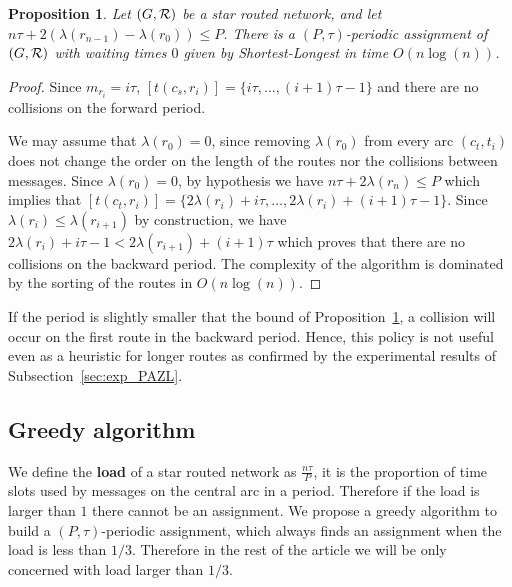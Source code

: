 \documentclass[10pt, conference, letterpaper]{IEEEtran}
\newtheorem{proposition}{Proposition}
\begin{document}
      
      \begin{proposition} Let $(G, {\cal R})$ be a star routed network, and let $n\tau + 2(\lambda(r_{n-1}) - \lambda(r_{0})) \leq P$. There is a $(P,\tau)$-periodic assignment of $(G, {\cal R})$ with waiting times $0$ given by Shortest-Longest in time $O(n\log(n))$.\label{prop:SL}
      \end{proposition}
      \begin{proof}
       Since $m_{r_i} = i\tau$, $[t(c_s,r_{i})] = \{i\tau,\dots, (i+1)\tau -1\}$ and there are no collisions on the forward period.
       
       
       We may assume that $\lambda(r_{0}) = 0$, since removing $\lambda(r_{0})$ from every arc $(c_t,t_i)$ does not change the order on the length of the routes nor the collisions between messages.
       Since $\lambda(r_{0}) = 0$, by hypothesis we have $n\tau + 2\lambda(r_{n}) \leq P$ which implies that
       $[t(c_t,r_{i})] = \{2 \lambda(r_{i}) + i\tau, \dots,  2 \lambda(r_{i}) + (i+1)\tau -1\}$.
       Since $ \lambda(r_{i}) \leq  \lambda(r_{i+1})$ by construction, we have  $2 \lambda(r_{i}) + i\tau -1 < 2 \lambda(r_{i+1}) + (i+1)\tau$ which proves that there are no collisions on the backward period. 
 The complexity of the algorithm is dominated by the sorting of the routes in $O(n\log(n))$. 
      \end{proof}

      If the period is slightly smaller that the bound of Proposition~\ref{prop:SL}, a collision will occur on the first route in the backward period. Hence, this policy is not useful even as a heuristic for longer routes as confirmed by the experimental results of Subsection~\ref{sec:exp_PAZL}. 

   
    \subsection{Greedy algorithm}
    
    
      We define the \textbf{load} of a star routed network as $\frac{n\tau}{P}$, it is the proportion of time slots used by messages on the central arc in a period. Therefore if the load is larger than $1$ there cannot be an assignment. We propose a greedy algorithm to build a $(P,\tau)$-periodic assignment, which always finds an assignment when the load is less than $1/3$. Therefore in the rest of the article we will be only concerned with load larger than $1/3$.
    
\end{document}
